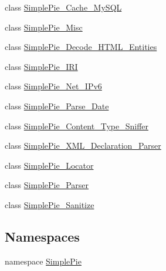 \begin{DoxyCompactItemize}
\item 
class \hyperlink{class_simple_pie___cache___my_s_q_l}{Simple\-Pie\-\_\-\-Cache\-\_\-\-My\-S\-Q\-L}
\item 
class \hyperlink{class_simple_pie___misc}{Simple\-Pie\-\_\-\-Misc}
\item 
class \hyperlink{class_simple_pie___decode___h_t_m_l___entities}{Simple\-Pie\-\_\-\-Decode\-\_\-\-H\-T\-M\-L\-\_\-\-Entities}
\item 
class \hyperlink{class_simple_pie___i_r_i}{Simple\-Pie\-\_\-\-I\-R\-I}
\item 
class \hyperlink{class_simple_pie___net___i_pv6}{Simple\-Pie\-\_\-\-Net\-\_\-\-I\-Pv6}
\item 
class \hyperlink{class_simple_pie___parse___date}{Simple\-Pie\-\_\-\-Parse\-\_\-\-Date}
\item 
class \hyperlink{class_simple_pie___content___type___sniffer}{Simple\-Pie\-\_\-\-Content\-\_\-\-Type\-\_\-\-Sniffer}
\item 
class \hyperlink{class_simple_pie___x_m_l___declaration___parser}{Simple\-Pie\-\_\-\-X\-M\-L\-\_\-\-Declaration\-\_\-\-Parser}
\item 
class \hyperlink{class_simple_pie___locator}{Simple\-Pie\-\_\-\-Locator}
\item 
class \hyperlink{class_simple_pie___parser}{Simple\-Pie\-\_\-\-Parser}
\item 
class \hyperlink{class_simple_pie___sanitize}{Simple\-Pie\-\_\-\-Sanitize}
\end{DoxyCompactItemize}
\subsection*{Namespaces}
\begin{DoxyCompactItemize}
\item 
namespace \hyperlink{namespace_simple_pie}{Simple\-Pie}
\end{DoxyCompactItemize}
